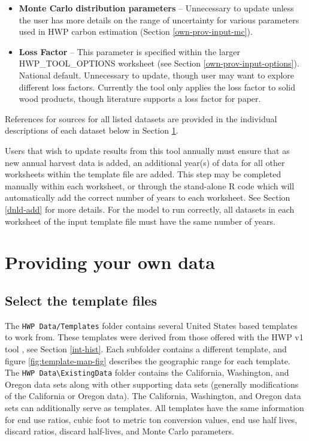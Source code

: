 \documentclass[
  openany]{book}
\begin{document}
\begin{itemize}
\item
  \textbf{Monte Carlo distribution parameters} -- Unnecessary to update unless the user has more details on the range of uncertainty for various parameters used in HWP carbon estimation (Section \ref{own-prov-input-mc}).
\item
  \textbf{Loss Factor} -- This parameter is specified within the larger HWP\_TOOL\_OPTIONS worksheet (see Section \ref{own-prov-input-options}). National default. Unnecessary to update, though user may want to explore different loss factors. Currently the tool only applies the loss factor to solid wood products, though literature supports a loss factor for paper.
\end{itemize}

References for sources for all listed datasets are provided in the individual descriptions of each dataset below in Section \ref{own-prov}.

Users that wish to update results from this tool annually must ensure that as new annual harvest data is added, an additional year(s) of data for all other worksheets within the template file are added. This step may be completed manually within each worksheet, or through the stand-alone R code which will automatically add the correct number of years to each worksheet. See Section \ref{dnld-add} for more details. For the model to run correctly, all datasets in each worksheet of the input template file must have the same number of years.

\hypertarget{own-prov}{%
\section{Providing your own data}\label{own-prov}}

\hypertarget{own-prov-temp}{%
\subsection{Select the template files}\label{own-prov-temp}}

The \texttt{HWP\ Data/Templates} folder contains several United States based templates to work from. These templates were derived from those offered with the HWP v1 tool \autocite{stockmann2014}, see Section \ref{int-hist}. Each subfolder contains a different template, and figure \ref{fig:template-map-fig} describes the geographic range for each template. The \texttt{HWP\ Data\textbackslash{}ExistingData} folder contains the California, Washington, and Oregon data sets along with other supporting data sets (generally modifications of the California or Oregon data). The California, Washington, and Oregon data sets can additionally serve as templates. All templates have the same information for end use ratios, cubic foot to metric ton conversion values, end use half lives, discard ratios, discard half-lives, and Monte Carlo parameters.
\end{document}
